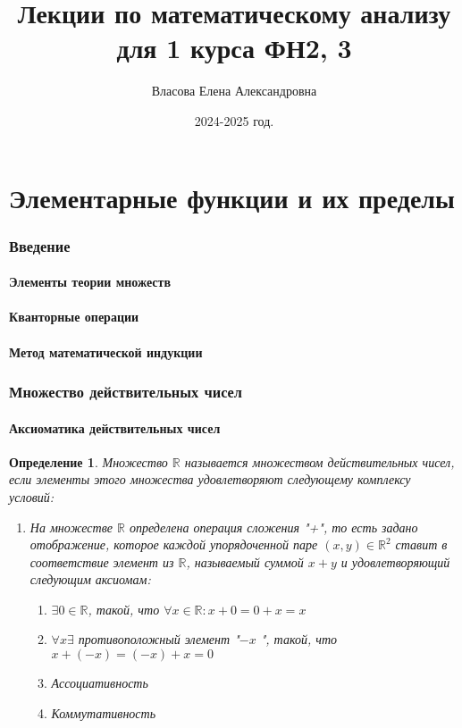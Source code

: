 \documentclass[a4paper,12pt]{article} %
\author{Власова Елена Александровна}
\title{Лекции по математическому анализу для 1 курса ФН2, 3}
\date{2024-2025 год.}
\newtheorem{definition}{Определение}
\begin{document}

\maketitle

\tableofcontents

\part*{Элементарные функции и их пределы}

\section{Введение}
\subsection{Элементы теории множеств}
\subsection{Кванторные операции}
\subsection{Метод математической индукции}

\section{Множество действительных чисел}
\subsection{Аксиоматика действительных чисел}
\begin{definition}
	Множество $\mathbb{R}$ называется множеством действительных чисел, если элементы этого множества удовлетворяют следующему комплексу условий:
\begin{enumerate}
	\item На множестве $\mathbb{R}$ определена операция сложения "+", то есть задано отображение, которое каждой упорядоченной паре $(x,y)\in \mathbb{R}^2$ ставит в соответствие элемент из $\mathbb{R}$, называемый суммой $x+y$ и удовлетворяющий следующим аксиомам:
		\begin{enumerate}
			\item $\exists 0\in \mathbb{R}$, такой, что $\forall x\in \mathbb{R}:x+0=0+x=x$
			\item $\forall x\exists$ противоположный элемент "$-x$ ", такой, что $x+(-x)=(-x)+x=0$
			\item Ассоциативность
			\item Коммутативность
		\end{enumerate}
\end{enumerate}
	
	
	
\end{definition}
\end{document}

